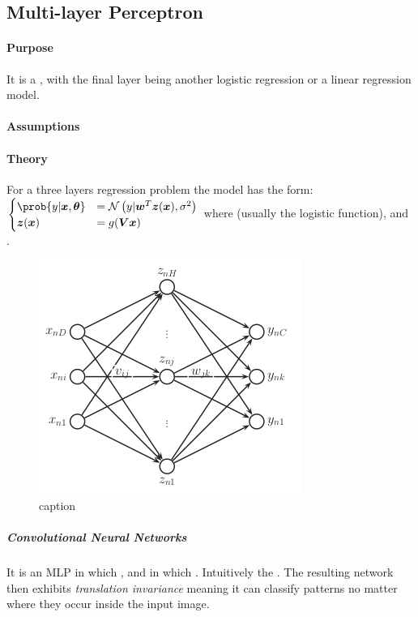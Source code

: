 \subsection{Multi-layer Perceptron}
\paragraph{Purpose}
It is a , with the final layer
being another logistic regression or a linear regression model.

\paragraph{Assumptions}
\paragraph{Theory}
For a three layers regression problem the model has the form:
$\begin{cases}
    \prob{y|\bm{x},\bm{\theta}} &= \mathcal{N}\left(y|\bm{w}^{T}\bm{z}(\bm{x}), \sigma^{2}\right)\\
    \bm{z}(\bm{x}) &= g(\bm{V}\bm{x})
\end{cases}$
where  (usually the logistic function),  and .
\begin{figure}[H]
    \begin{center}
        \includegraphics[width=.5\textwidth]{./chapters/3_classical_learning/01_supervised_learning/3_images/1_neural_network_one_hl.png}
    \end{center}
    \caption{caption}
    \label{fig:1_neural_network_one_hl}
\end{figure}
\subparagraph{Convolutional Neural Networks}
It is an MLP in which , and in which . 
Intuitively the . The resulting network then exhibits \emph{translation invariance} meaning
it can classify patterns no matter where they occur inside the input image.

